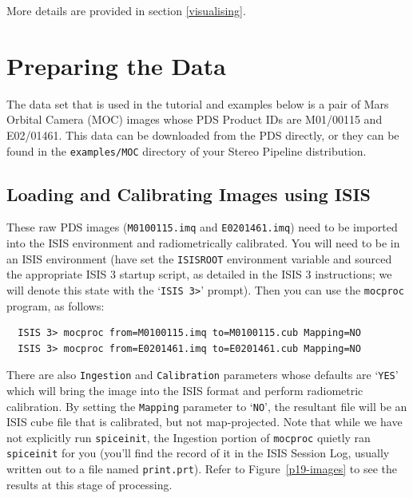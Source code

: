 More details are provided in section \ref{visualising}.

\section{Preparing the Data}

The data set that is used in the tutorial and examples below is a
pair of Mars Orbital Camera (\ac{MOC}) \citep{1992JGR....97.7699M,2001JGR...10623429M}
images whose \ac{PDS} Product IDs are M01/00115 and E02/01461.
This data can be downloaded from the PDS directly, or they can be
found in the \texttt{examples/MOC} directory of your Stereo Pipeline distribution.

\subsection{Loading and Calibrating Images using ISIS}

These raw \ac{PDS} images (\texttt{M0100115.imq} and \texttt{E0201461.imq})
need to be imported into the \ac{ISIS} environment and radiometrically
calibrated.  You will need to be in an \ac{ISIS} environment (have
set the \texttt{ISISROOT} environment variable and sourced the
appropriate \ac{ISIS} 3 startup script, as detailed in the \ac{ISIS}
3 instructions; we will denote this state with the `\texttt{ISIS
3>}' prompt).  Then you can use the \texttt{mocproc} program, as follows:

\begin{verbatim}
  ISIS 3> mocproc from=M0100115.imq to=M0100115.cub Mapping=NO
  ISIS 3> mocproc from=E0201461.imq to=E0201461.cub Mapping=NO
\end{verbatim}

There are also \texttt{Ingestion} and \texttt{Calibration} parameters
whose defaults are `\texttt{YES}' which will bring the image into the
\ac{ISIS} format and perform radiometric calibration.  By setting the
\texttt{Mapping} parameter to `\texttt{NO}', the resultant file will be
an \ac{ISIS} cube file that is calibrated, but not map-projected.
Note that while we have not explicitly run \texttt{spiceinit}, the
Ingestion portion of \texttt{mocproc} quietly ran \texttt{spiceinit}
for you (you'll find the record of it in the \ac{ISIS} Session Log,
usually written out to a file named \texttt{print.prt}).  Refer to
Figure~\ref{p19-images} to see the results at this stage of
processing.

